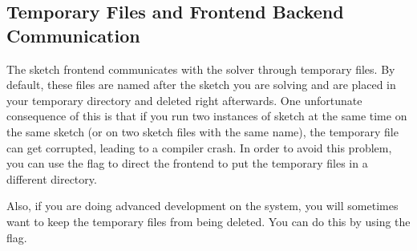 \subsection{Temporary Files and Frontend Backend Communication}

The sketch frontend communicates with the solver through temporary files. 
By default, these files are named after the sketch you are solving and 
are placed in your temporary directory and deleted right afterwards. One 
unfortunate consequence of this is that if you run two instances of sketch at the same 
time on the same sketch (or on two sketch files with the same name), the temporary file
can get corrupted, leading to a compiler crash. In order to avoid this problem, you can use the flag 
 to direct the frontend to put the temporary files in a different directory. 


Also, if you are doing advanced development on the system, you will sometimes want to keep 
the temporary files from being deleted. You can do this by using the  flag.

